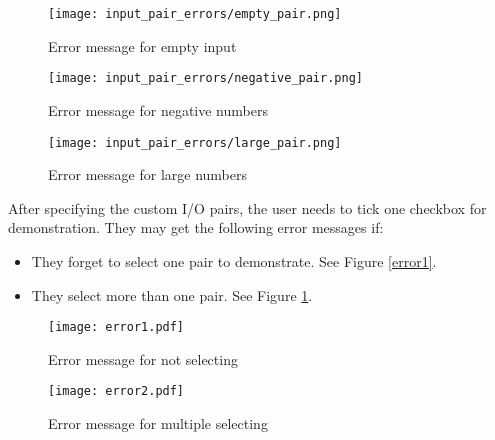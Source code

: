 \begin{figure}[H]
  \centering
  \begin{minipage}[b]{0.28\textwidth}
    \texttt{[image: input\_pair\_errors/empty\_pair.png]}
    \caption{Error message for empty input}
  \end{minipage}
  \hfill
  \begin{minipage}[b]{0.29\textwidth}
    \texttt{[image: input\_pair\_errors/negative\_pair.png]}
    \caption{Error message for negative numbers}
  \end{minipage}
  \hfill
  \begin{minipage}[b]{0.3\textwidth}
    \texttt{[image: input\_pair\_errors/large\_pair.png]}
    \caption{Error message for large numbers}
  \end{minipage}
\end{figure}

After specifying the custom I/O pairs, the user needs to tick one checkbox for demonstration. They may get the following error messages if:
\begin{itemize}
    \item They forget to select one pair to demonstrate. See Figure \ref{error1}.
    \item They select more than one pair. See Figure \ref{error2}.
\end{itemize}

\begin{figure}[H]
  \centering
  \begin{minipage}[b]{0.4\textwidth}
    \texttt{[image: error1.pdf]}
    \caption{Error message for not selecting}
    \label{error1}
  \end{minipage}
  \hfill
  \begin{minipage}[b]{0.4\textwidth}
    \texttt{[image: error2.pdf]}
    \caption{Error message for multiple selecting}
    \label{error2}
  \end{minipage}
\end{figure}